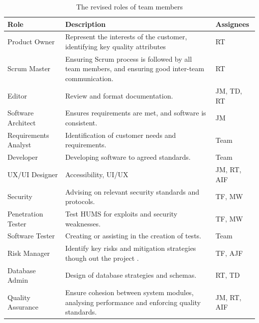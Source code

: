 \begin{table}[H]
\begin{tabular}{ | p{3.5cm} | p{8.5cm} | p{2cm} |}
\hline
\rowcolor{titleColor}\textbf{Role}
&  \textbf{Description} 
& \textbf{Assignees} \\ \hline

Product Owner & Represent the interests of the customer, identifying key quality attributes & RT \\ \hline

Scrum Master  &   Ensuring Scrum process is followed by all team members, and ensuring good inter-team communication.            		& RT           				\\ \hline
Editor  &   Review and format documentation. & JM, TD, RT \\ \hline

Software Architect  &  Ensures requirements are met, and software is consistent. & JM \\ \hline

Requirements Analyst  &   Identification of customer needs and requirements.  & Team \\ \hline

Developer &   Developing software to agreed standards. &  Team     \\ \hline

UX/UI Designer    &   Accessibility, UI/UX	& JM, RT, AIF    \\ \hline

Security    &   Advising on relevant security standards and protocols. & TF, MW  \\ \hline

Penetration Tester & Test HUMS for exploits and security weaknesses. &TF, MW \\ \hline

Software Tester &   Creating or assisting in the creation of tests. & Team  	 \\ \hline

Risk Manager &   Identify key risks and mitigation strategies though out the project .  & TF, AJF \\ \hline

Database Admin &   Design of database strategies and schemas. & RT, TD                   \\ \hline
Quality Assurance   &   Ensure cohesion between system modules, analysing performance and enforcing quality standards.  & JM, RT, AIF \\ \hline
\end{tabular}
\caption{The revised roles of team members}
\label{tab:roles}
\end{table}

